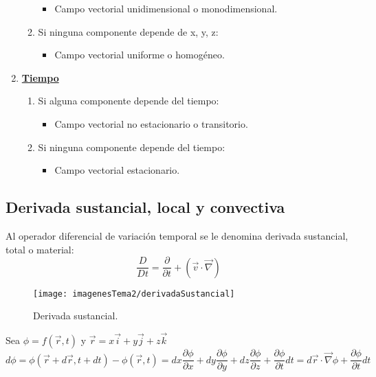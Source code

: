 \begin{enumerate}
\begin{enumerate}
		\begin{itemize}
			\item Campo vectorial unidimensional o monodimensional.
		\end{itemize}
		\item Si ninguna componente depende de x, y, z: 
		\begin{itemize}
			\item Campo vectorial uniforme o homogéneo.
		\end{itemize}
	\end{enumerate}
	\item \underline{\textbf{Tiempo}}
	\begin{enumerate}
		\item Si alguna componente depende del tiempo:
		\begin{itemize}
			\item Campo vectorial no estacionario o transitorio.
		\end{itemize}
		\item Si ninguna componente depende del tiempo:
		\begin{itemize}
			\item Campo vectorial estacionario.
		\end{itemize}
	\end{enumerate}
\end{enumerate}
\subsection{Derivada sustancial, local y convectiva}
Al operador diferencial de variación temporal se le denomina derivada sustancial, total o material:
\[\frac{D}{Dt}=\frac{\partial}{\partial t}+\left(\vec{v} \cdot \vec{\nabla}\right)\]

\begin{figure}[H]
	\centering
	\texttt{[image: imagenesTema2/derivadaSustancial]}
	\caption{Derivada sustancial.}
	\label{fig:derivadasustancial}
\end{figure}

Sea $\phi=f(\vec{r},t)$ y $\vec{r}=x\vec{i}+y\vec{j}+z\vec{k}$
\[d\phi=\phi(\vec{r}+d\vec{r},t+dt)-\phi(\vec{r},t)=dx\frac{\partial \phi}{\partial x}+dy\frac{\partial \phi}{\partial y}+dz\frac{\partial \phi}{\partial z}+\frac{\partial \phi}{\partial t}dt=d\vec{r} \cdot\vec{\nabla}\phi+\frac{\partial \phi}{\partial t}dt\]

